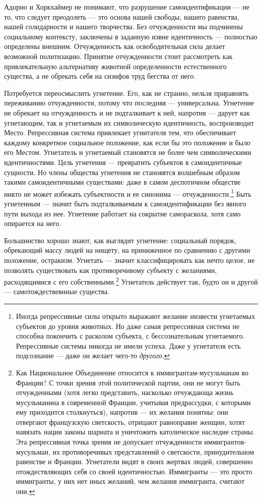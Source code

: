 \documentclass[12pt]{book}
\begin{document}
Адорно и Хоркхаймер не понимают, что разрушение самоидентификации --- не то, что следует преодолеть --- это основа нашей свободы, нашего равенства, нашей солидарности и нашего творчества. Без отчужденности мы подчинены социальному контексту, заключены в заданную извне идентичность --- полностью определены внешним. Отчужденность как освободительная сила делает возможной политизацию. Принятие отчужденности стоит рассмотреть как привлекательную альтернативу животной определенности естественного существа, а не обрекать себя на сизифов труд бегства от него.

Потребуется переосмыслить угнетение. Его, как не странно, нельзя приравнять переживанию отчужденности, потому что последняя --- универсальна. Угнетение не обрекает на отчужденность и не подталкивает к ней, напротив --- дарует как угнетающим, так и угнетаемым их символическую идентичность, воспроизводит Место. Репрессивная система привлекает угнитателя тем, что обеспечивает каждому конкретное социальное положение, как если бы это положение и было его Местом. Угнетатель и угнетаемый становятся не более чем символическими идентичностями. Цель угнетения --- превратить субъектов в самоидентичные сущности. Но члены общества угнетения не становятся волшебным образом такими самоидентичными существами: даже в самом деспотичном обществе никто не может избежать субъектности и ее синонима --- отчужденности.\footnote{Иногда репрессивные силы открыто выражают желание низвести угнетаемых субъектов до уровня животных. Но даже самая репрессивная система не способна покончить с расколом субъекта, с бессознательным угнетаемого. Репрессивные системы никогда не имели успеха. Даже у угнетателя есть подсознание --- даже он желает чего-то \textit{другого}.} Быть угнетенным --- значит быть подталкиваемым к самоидентификации без явного пути выхода из нее. Угнетение работает на сокрытие самораскола, хотя само опирается на него.

Большинство хорошо знают, как выглядит угнетение: социальный порядок, обрекающий массу людей на нищету, на приниженное по сравнению с другими положение, остракизм. Угнетать --- значит классифицировать как нечто целое, не позволять существовать как противоречивому субъекту с желаниями, расходящимися с его собственными.\footnote{Как Национальное Объединение относится к иммигрантам-мусульманам во Франции? С точки зрения этой политической партии, они не могут быть отчужденными (хотя легко представить, насколько отчуждающа жизнь мусульманина в современной Франции, учитывая предрассудки, с которыми ему приходится столкнуться), напротив --- их желания понятны: они отвергают французскую светскость, отрицают равноправие женщин, хотят навязать нации законы шариата и уничтожить католическое наследие страны. Эта репрессивная точка зрения не допускает отчужденности иммигрантов-мусульман, их противоречивых представлений о светскости, принудительном равенстве и Франции. Угнетатели видят в своих жертвах людей, совершенно отождествляющих себя со своей идентичностью. Иммигранты --- это просто иммигранты, у них нет иных желаний, чем желания иммигранта, считают они.} Угнетатель действует так, будто он и другой --- самотождествевнные существа.
\end{document}
